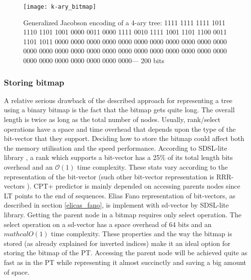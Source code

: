 \begin{figure}
	 \centering
    \texttt{[image: k-ary\_bitmap]}
    \caption{Generalized Jacobson encoding of a 4-ary tree: 1111 1111 1111 1011 1110 1101 1001 0000 0011 0000 1111 0010 1111 1001 1101 1100 0011 1101 1011 0000 0000 0000 0000 0000 0000 0000 0000 0000 0000 0000 0000 0000 0000 0000 0000 0000 0000 0000 0000 0000 0000 0000 0000 0000 0000 0000 0000 0000 0000 0000--- 200 bits}
    \label{fig:k-ary-bm}
\end{figure}

\subsubsection*{Storing bitmap}
A relative serious drawback of the described approach for representing a tree using a binary bitmap is the fact that the bitmap gets quite long. The overall length is twice as long as the total number of nodes. Usually, rank/select operations have a space and time overhead that depends upon the type of the bit-vector that they support. Deciding how to store the bitmap could affect both the memory utilisation and the speed performance. According to SDSL-lite library \cite{gog_2015}, a rank which supports a bit-vector has a 25\% of its total length bits overhead and an \(\mathcal{O}(1)\) time complexity. These stats vary according to the representation of the bit-vector (such other bit-vector representation is RRR-vectors \cite{Raman}). CPT+ predictor is mainly depended on accessing parents nodes since LT points to the end of sequences. Elias Fano representation of bit-vectors, as described in section \ref{elicas_fano}, is implement with sd-vector by SDSL-lite library. Getting the parent node in a bitmap requires only select operation. The select operation on a sd-vector has a space overhead of 64 bits and an \(mathcal{O}(1)\) time complexity. These properties and the way the bitmap is stored (as already explained for inverted indices) make it an ideal option for storing the bitmap of the PT. Accessing the parent node will be achieved quite as fast as in the PT while representing it almost succinctly and saving a big amount of space. 
 
